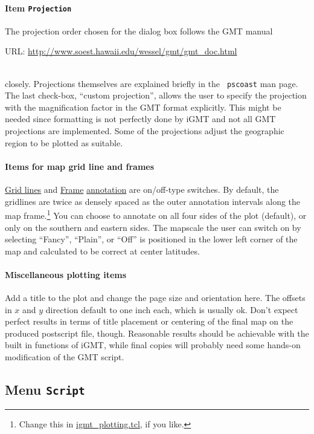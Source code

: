 \documentclass[11pt]{article}
\begin{document}
\paragraph{Item {\tt Projection}}
The projection order chosen for the dialog box follows the GMT manual\\
\centerline{URL: \url{http://www.soest.hawaii.edu/wessel/gmt/gmt_doc.html}}\\
closely. Projections themselves are explained briefly in the {\tt
  pscoast} man page. The last check-box, ``custom projection'', allows
the user to specify the projection with the magnification factor in
the GMT format explicitly. This might be needed since formatting is
not perfectly done by iGMT and not all GMT projections are
implemented.  Some of the projections adjust the geographic region to
be plotted as suitable.

\paragraph{Items for map grid line and frames}
\url{Grid lines} and \url{Frame} \url{annotation} are on/off-type
switches.  By default, the gridlines are twice as densely spaced as
the outer annotation intervals along the map frame.\footnote{Change
  this in \url{igmt_plotting.tcl}, if you like.} You can choose to
annotate on all four sides of the plot (default), or only on the
southern and eastern sides.  The mapscale the user can switch on by
selecting ``Fancy'', ``Plain'', or ``Off'' is positioned in the lower
left corner of the map and calculated to be correct at center
latitudes.

\paragraph{Miscellaneous plotting items}
Add a title to the plot and change the page size and orientation here.
The offsets in $x$ and $y$ direction default to one inch each, which
is usually ok. Don't expect perfect results in terms of title
placement or centering of the final map on the produced postscript
file, though. Reasonable results should be achievable with the built
in functions of iGMT, while final copies will probably need some
hands-on modification of the GMT script.


\subsection{Menu {\tt Script}}
\end{document}
